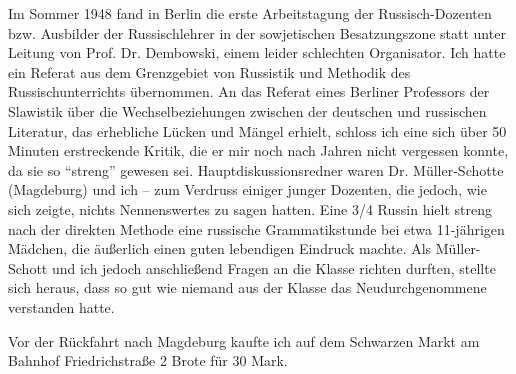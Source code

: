 \documentclass[a5paper,pagesize,10pt,twoside=true]{scrbook}
\renewcommand{\marginpar}[2][]{}
\begin{document}
Im Sommer 1948 fand in Berlin die erste Arbeitstagung der Russisch-Do\-zen\-ten bzw. Ausbilder der Russischlehrer in der sowjetischen Besatzungszone statt unter Leitung von Prof. Dr. Dembowski, einem leider schlechten Organisator. Ich hatte ein Referat aus dem Grenzgebiet von Russistik und Methodik des Russischunterrichts übernommen. An das Referat eines Berliner Professors der Slawistik über die Wechselbeziehungen zwischen der deutschen und russischen Literatur, das erhebliche Lücken und Mängel erhielt, schloss ich eine sich über 50 Minuten erstreckende \marginpar{142} Kritik, die er mir noch nach Jahren nicht vergessen konnte, da sie so \enquote{streng} gewesen sei. Hauptdiskussionsredner waren Dr. Müller-Schotte (Magdeburg) und ich -- zum Verdruss einiger junger Dozenten, die jedoch, wie sich zeigte, nichts Nennenswertes zu sagen hatten. Eine 3/4 Russin hielt streng nach der direkten Methode eine russische Grammatikstunde bei etwa 11-jährigen Mädchen, die äußerlich einen guten lebendigen Eindruck machte. Als Müller-Schott und ich jedoch anschließend Fragen an die Klasse richten durften, stellte sich heraus, dass so gut wie niemand aus der Klasse das Neudurchgenommene verstanden hatte.

Vor der Rückfahrt nach Magdeburg kaufte ich auf dem Schwarzen Markt am Bahnhof Friedrichstraße 2 Brote für 30 Mark.
\end{document}
